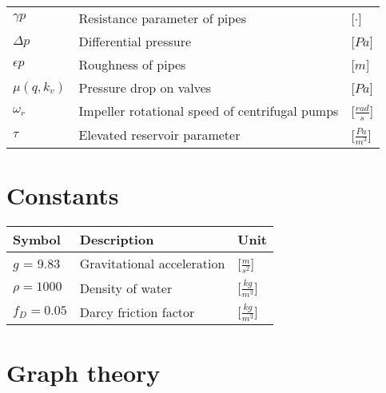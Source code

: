 \begin{tabular}{l l l}
	$\gamma p$			&	Resistance parameter of pipes 						& \hspace{25mm}[$\cdot$]\\	
	$\Delta p$			&	Differential pressure 						    	& \hspace{25mm}[$Pa$]\\
	$\epsilon p$		&	Roughness of pipes 						    		& \hspace{25mm}[$m$]\\	
	$\mu(q,k_v)$		&	Pressure drop on valves 						   	& \hspace{25mm}[$Pa$]\\
	$\omega_r$			&	Impeller rotational speed of centrifugal pumps 		& \hspace{25mm}[$\frac{rad}{s}$]\\
	$\tau$				&	Elevated reservoir parameter 			 			& \hspace{25mm}[$\frac{Pa}{m^3}$]\\	
\end{tabular}

\section*{Constants}

\begin{tabular}{l l l} 
	\textbf{Symbol}		&	\textbf{Description}							& \hspace{64mm}\textbf{Unit}			\\\hline						
	$g$ = 9.83 			&	Gravitational acceleration						& \hspace{64mm}[$\frac{m}{s^2}$]\\
	$\rho = 1000$		&	Density of water								& \hspace{64mm}[$\frac{kg}{m^3}$]\\
	$f_D = 0.05$			&	Darcy friction factor							& \hspace{64mm}[$\frac{kg}{m^3}$]\\
\end{tabular}

\section*{Graph theory}

